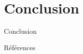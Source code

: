 \documentclass[aspectratio=169,xcolor=dvipsnames]{beamer}
\begin{document}
\section{Conclusion}
\begin{frame}{Conclusion}
\end{frame}

\begin{frame}{Références}
    \nocite{*}
    \printbibliography[title = Références]
\end{frame}
\end{document}
